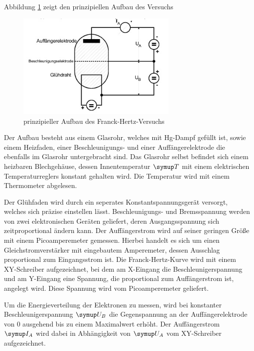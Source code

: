 Abbildung \ref{fig:aufbau} zeigt den prinzipiellen Aufbau des Versuchs
\begin{figure}
  \centering
  \includegraphics[width=0.7\textwidth]{bilder/aufbau.jpg}
  \caption{prinzipieller Aufbau des Franck-Hertz-Versuchs \cite{601}}
  \label{fig:aufbau}
\end{figure}
Der Aufbau besteht aus einem Glasrohr, welches mit Hg-Dampf gefüllt ist,
sowie einem Heizfaden, einer Beschleunigungs- und einer Auffängerelektrode
die ebenfalls im Glasrohr untergebracht sind.
Das Glasrohr selbst befindet sich einem heizbaren Blechgehäuse, dessen
Innentemperatur $\su{T}$ mit einem elektrischen Temperaturreglers konstant
gehalten wird. Die Temperatur wird mit einem Thermometer abgelesen.

Der Glühfaden wird durch ein seperates Konstantspannungsgerät versorgt, welches
sich präzise einstellen lässt. Beschleunigungs- und Bremsspannung werden von
zwei elektronischen Geräten geliefert, deren Ausgangsspannung sich
zeitproportional ändern kann. Der Auffängerstrom wird auf seiner geringen Größe
mit einem Picoamperemeter gemessen. Hierbei handelt es sich um einen
Gleichstromverstärker mit eingebautem Amperemeter, dessen Ausschlag proportional
zum Eingangsstrom ist. Die Franck-Hertz-Kurve wird mit einem XY-Schreiber
aufgezeichnet, bei dem am X-Eingang die Beschleunigerspannung und am Y-Eingang
eine Spannung, die proportional zum Auffängerstrom ist, angelegt wird. Diese
Spannung wird vom Picoamperemeter geliefert.

Um die Energieverteilung der
Elektronen zu messen, wird bei konstanter Beschleunigerspannung $\su{U_B}$ die
Gegenspannung an der Auffängerelektrode von 0 ausgehend bis zu einem Maximalwert
erhöht. Der Auffängerstrom $\su{I_A}$ wird dabei in Abhängigkeit von $\su{U_A}$
vom XY-Schreiber aufgezeichnet.

